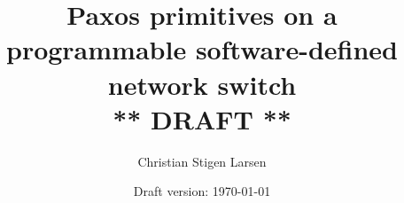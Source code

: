 \documentclass[a4paper,twoside]{report}
\begin{document}
  \author{Christian Stigen Larsen}
  \date{Draft version: \today}
  \title{Paxos primitives on a programmable software-defined
    network switch\\\textsf{** DRAFT **}}

  \maketitle
  

  \listoftodos %
  \listoftables
  \listoffigures
  \listofalgorithms{}
  \lstlistoflistings{}

  \tableofcontents

  

  
  
  
  
  
  
  
  

  
  

  \appendix
    

  \clearpage %
  \printindex
  
\end{document}
